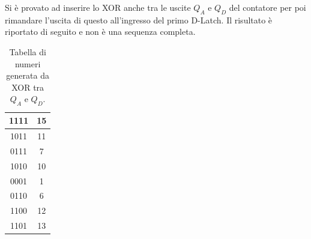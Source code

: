 \documentclass[10pt,a4paper]{article}
\begin{document}
Si è provato ad inserire lo XOR anche tra le uscite $Q_A$ e $Q_D$ del contatore per poi rimandare l'uscita di questo all'ingresso del primo D-Latch. Il risultato è riportato di seguito e non è una sequenza completa.

\begin{table}[!htb]
\centering
\begin{tabular}{|c|c|}
\hline 
1111 & 15 \\ 
\hline 
1011 & 11 \\ 
\hline 
0111 & 7 \\ 
\hline 
1010 & 10 \\ 
\hline 
0001 & 1 \\ 
\hline 
0110 & 6 \\ 
\hline 
1100 & 12 \\ 
\hline 
1101 & 13 \\ 
\hline 
\end{tabular}
\caption{Tabella di numeri generata da XOR tra $Q_A$ e $Q_D$.\label{AD}}  
\end{table}
\end{document}
